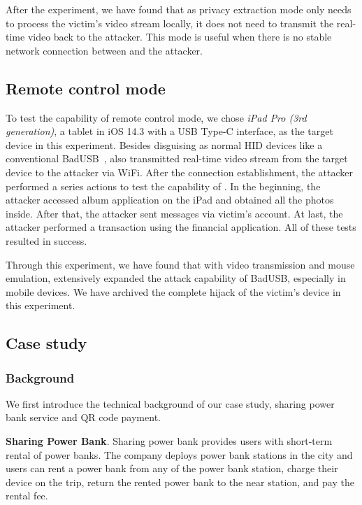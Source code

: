 After the
experiment, we have found that as privacy extraction mode only needs to
process the victim's video stream locally, it does not need to transmit the real-time video back to the attacker. This mode is useful when there is no stable network connection between \tool and the attacker.

\subsection{Remote control mode}

To test the capability of remote control mode, we chose \textit{iPad Pro (3rd
	generation)}, a tablet in iOS 14.3 with a USB Type-C interface, as the target
device in this experiment.  Besides disguising as normal HID devices like a
conventional BadUSB~\cite{badusb}, \tool also transmitted real-time video
stream from the target device to the attacker via WiFi.  After the connection
establishment, the attacker performed a series actions to test the capability of
\tool. In the beginning, the attacker accessed album application on the iPad and
obtained all the photos inside. After that, the attacker sent messages via victim's
account. At last, the attacker performed a transaction using the
financial application. All of these tests resulted in success.

Through this experiment, we have found that with video transmission and mouse
emulation, \tool extensively expanded the attack capability of BadUSB,
especially in mobile devices. We have archived the complete hijack of the victim's
device in this experiment.

\subsection{Case study}
\label{subsec:case_study}
\subsubsection{Background}

We first introduce the technical background of our case study, sharing power
bank service and QR code payment.

\textbf{Sharing Power Bank}.  Sharing power bank provides users with short-term
rental of power banks.  The company deploys power bank stations in the city and
users can rent a power bank from any of the power bank station, charge their
device on the trip, return the rented power bank to the near station, and pay
the rental fee.

